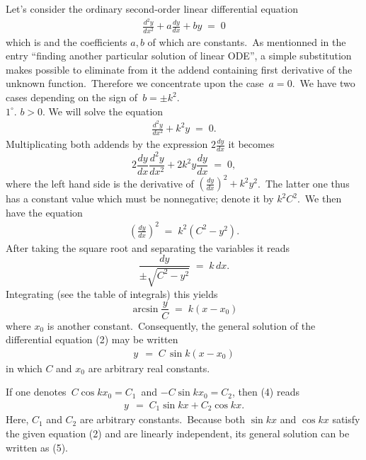 \documentclass[12pt]{article}
\begin{document}
Let's consider the ordinary second-order linear differential equation
\begin{align}
      \frac{d^2y}{dx^2}+a\frac{dy}{dx}+by \;=\; 0
\end{align}
which is 
and the coefficients $a, b$ of which are constants.\, As 
mentionned in the entry 
``finding another particular solution of linear ODE'', a simple substitution 
makes possible to eliminate from it the addend containing first 
derivative of the unknown function.\, Therefore we 
concentrate upon the case\, $a = 0$.\, We have two cases 
depending on the sign of\, $b = \pm k^2$.\\

\textbf{$1^\circ$}.\; $b > 0$.\;  We will solve the equation
\begin{align}
\frac{d^2y}{dx^2}+k^2y \;=\; 0.
\end{align}
Multiplicating both addends by the expression $2\frac{dy}{dx}$ it becomes
$$2\frac{dy}{dx}\frac{d^2y}{dx^2}+2k^2y\frac{dy}{dx} \;=\; 0,$$
where the left hand side is the derivative of 
$\left(\frac{dy}{dx}\right)^2+k^2y^2$.\, The latter one thus has a constant value 
which must be nonnegative; denote it by $k^2C^2$.\, We then have the equation
\begin{align}
\left(\frac{dy}{dx}\right)^2 \;=\; k^2(C^2-y^2).
\end{align}
After taking the square root and separating the variables it reads
$$\frac{dy}{\pm\sqrt{C^2\!-y^2}} \;=\; k\,dx.$$
Integrating (see the table of integrals) this yields
$$\arcsin\frac{y}{C} \;=\; k(x\!-\!x_0)$$
where $x_0$ is another constant.\, Consequently, the general 
solution of the differential equation (2) may be written
\begin{align}
y \,\;=\; C\,\sin k(x\!-\!x_0)
\end{align}
in which $C$ and $x_0$ are arbitrary real constants. 

If one denotes\, $C\cos kx_0 = C_1$\, and $-C\sin kx_0 = C_2$,
then (4) reads
\begin{align}
y \,\;=\; C_1\sin kx+C_2\cos kx.
\end{align}
Here, $C_1$ and $C_2$ are arbitrary constants.\, Because both 
$\sin kx$ and $\cos kx$  satisfy the given equation (2) and are 
linearly independent, its general solution can be written as (5).\\
\end{document}
